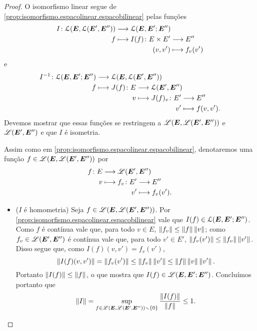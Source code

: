 \begin{proof}
O isomorfismo linear segue de \ref{prop:isomorfismo.espacolinear.espacobilinear} pelas funções
	\begin{align*}
	\func{I}{\lin(\bm E,\lin(\bm E',\bm E''))}{\lin(\bm E,\bm E';\bm E'')}{f}{
		\begin{aligned}[t]
		\func{I(f)}{E \times E'}{E''}{(v,v')}{f_v(v')}
		\end{aligned}
	}
	\end{align*}
e
	\begin{align*}
	\func{I\inv}{\lin(\bm E,\bm E';\bm E'')}{\lin(\bm E,\lin(\bm E',\bm E''))}{f}{
		\begin{aligned}[t]
		\func{J(f)}{E}{\lin(\bm E',\bm E'')}{v}{
			\begin{aligned}[t]
			\func{J(f)_v}{E'}{E''}{v'}{f(v,v')}.
			\end{aligned}
		}
		\end{aligned}
	}
	\end{align*}
Devemos mostrar que essas funções se restringem a $\mathscr{L}(\bm E,\mathscr{L}(\bm E',\bm E''))$ e $\mathscr{L}(\bm E',\bm E'')$ e que $I$ é isometria.

Assim como em \ref{prop:isomorfismo.espacolinear.espacobilinear}, denotaremos uma função $f \in \mathscr{L}(\bm E,\mathscr{L}(\bm E',\bm E''))$ por
	\begin{align*}
	\func{f}{E}{\toplin(\bm E',\bm E'')}{v}{
		\begin{aligned}[t]
		\func{f_v}{E'}{E''}{v'}{f_v(v')}.
		\end{aligned}
	}
	\end{align*}

\begin{itemize}
	\item ($I$ é homometria) Seja $f \in \mathscr{L}(\bm E,\mathscr{L}(\bm E',\bm E''))$. Por \ref{prop:isomorfismo.espacolinear.espacobilinear} vale que $I(f) \in \mathcal{L}(\bm E,\bm E';\bm E'')$. Como $f$ é contínua vale que, para todo $v \in E$, $\left\Vert{f_v}\right\Vert \leq \left\Vert{f}\right\Vert\left\Vert{v}\right\Vert$; como $f_v \in \mathscr{L}(\bm E',\bm E'')$ é contínua vale que, para todo $v' \in E'$, $\left\Vert{f_v(v')}\right\Vert \leq \left\Vert{f_v}\right\Vert\left\Vert{v'}\right\Vert$. Disso segue que, como $I(f)(v,v') = f_v(v')$,
		\begin{equation*}
		\left\Vert{I(f)(v,v')}\right\Vert = \left\Vert{f_v(v')}\right\Vert \leq \left\Vert{f_v}\right\Vert\left\Vert{v'}\right\Vert \leq \left\Vert{f}\right\Vert\left\Vert{v}\right\Vert\left\Vert{v'}\right\Vert.
		\end{equation*}
	Portanto $\left\Vert{I(f)}\right\Vert \leq \left\Vert{f}\right\Vert$, o que mostra que $I(f) \in \mathscr{L}(\bm E,\bm E';\bm E'')$. Concluímos portanto que
		\begin{equation*}
		\left\Vert{I}\right\Vert = \sup_{f \in \mathscr{L}(\bm E,\mathscr{L}(\bm E',\bm E'')) \smallsetminus \{0\}} \frac{\left\Vert{I(f)}\right\Vert}{\left\Vert{f}\right\Vert} \leq 1.
		\end{equation*}


\end{itemize}
\end{proof}
